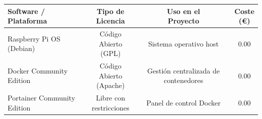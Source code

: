 \begin{table}[H]
    \centering
    \small
    \renewcommand{\arraystretch}{1.2}
    \setlength{\tabcolsep}{4pt}
    \begin{tabular}{|l|c|c|c|}
        \hline
        \rowcolor[gray]{0.9} 
        \parbox[c]{3.2cm}{\vspace{0.15cm}\centering\textbf{Software /\\Plataforma}\vspace{0.15cm}} & \parbox[c]{3.0cm}{\centering\textbf{Tipo de\\Licencia}} & \parbox[c]{3.8cm}{\centering\textbf{Uso en el\\Proyecto}\vspace{0.15cm}} & \parbox[c]{1.5cm}{\centering\textbf{Coste\\(\euro)}} \\ \hline
        \parbox[c]{3.2cm}{\vspace{0.1cm}Raspberry Pi OS (Debian)\vspace{0.1cm}}       & \parbox[c]{3.0cm}{\centering\vspace{0.1cm}Código Abierto\\(GPL)\vspace{0.1cm}}      & \parbox[c]{3.8cm}{\centering\vspace{0.15cm}Sistema operativo host\vspace{0.15cm}}      & 0.00 \\ \hline
        \parbox[c]{3.2cm}{\vspace{0.1cm}Docker Community Edition\vspace{0.1cm}}       & \parbox[c]{3.0cm}{\centering\vspace{0.1cm}Código Abierto\\(Apache)\vspace{0.1cm}}   & \parbox[c]{3.8cm}{\centering\vspace{0.15cm}Gestión centralizada de contenedores\vspace{0.15cm}}& 0.00 \\ \hline
        \parbox[c]{3.2cm}{\vspace{0.1cm}Portainer Community Edition\vspace{0.1cm}}    & \parbox[c]{3.0cm}{\centering\vspace{0.1cm}Libre con\\restricciones\vspace{0.1cm}}   & \parbox[c]{3.8cm}{\centering\vspace{0.15cm}Panel de control Docker\vspace{0.15cm}}     & 0.00 \\ \hline

\end{tabular}
\end{table}
